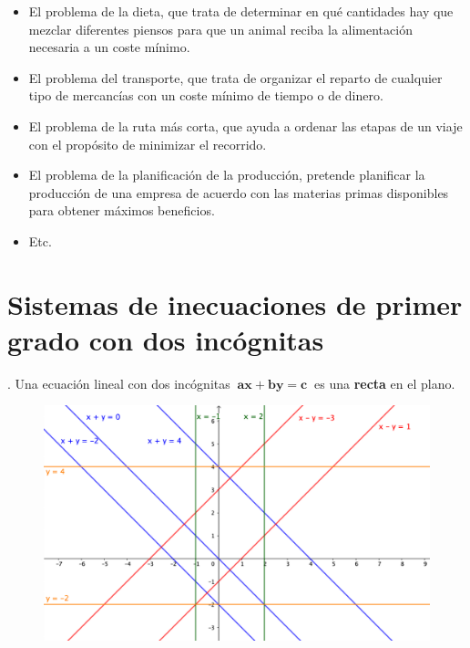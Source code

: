 \begin{itemize}
\item El problema de la dieta, que trata de determinar en qué cantidades hay que mezclar diferentes piensos para que un animal reciba la alimentación necesaria a un coste mínimo.

\item El problema del transporte, que trata de organizar el reparto de cualquier tipo de mercancías con un coste mínimo de tiempo o de dinero.

\item El problema de la ruta más corta, que ayuda a ordenar las etapas de un viaje con el propósito de minimizar el recorrido.

\item El problema de la planificación de la producción, pretende planificar la producción de una empresa de acuerdo con las materias primas disponibles para obtener máximos beneficios.
\item Etc.
\end{itemize}



\section{Sistemas de inecuaciones de primer grado con dos incógnitas}
	\vspace{10mm}

\begin{theorem}
.	Una ecuación lineal con dos incógnitas $ \ \boldsymbol{ax+by=c} \ $ es una \textbf{recta} en el plano.
\end{theorem}

\begin{figure}[H]
	\centering
	\includegraphics[width=.9\textwidth]{imagenes/img05.png}
\end{figure}

